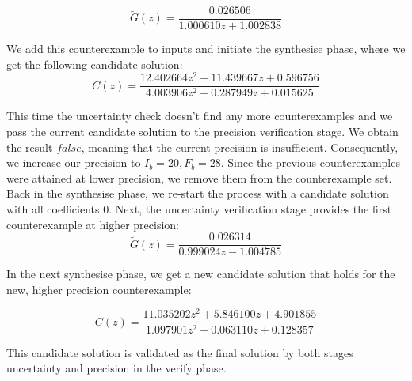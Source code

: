 \documentclass{sig-alternate-05-2015}
\newcommand{\blue}[1]{{\color{blue}#1}}
\newcommand{\red}[1]{{\color{red}#1}}
\begin{document}
$$
\tilde G(z) = \frac{0.026506}{1.000610z+1.002838}
$$



We add this counterexample to {\sc inputs} and initiate the {\sc synthesise} phase, where we get the following candidate solution: 
$$
C(z)=\frac{12.402664z^2{-}11.439667z{+}0.596756}{4.003906z^2{-}0.287949z{+}0.015625}
$$

This time the {\sc uncertainty} check doesn't find any more counterexamples 
and we pass the current candidate solution to the {\sc precision} verification stage.
We obtain the result $false$, meaning that the current precision is insufficient.
Consequently, we increase our precision to $I_b=20,F_b=28$.
%
Since the previous counterexamples were attained at lower precision, we
remove them from the counterexample set.  Back in the {\sc synthesise}
phase, we re-start the process with a candidate solution with all
coefficients $0$.  Next, the {\sc uncertainty} verification stage provides
the first counterexample at higher precision:
%
$$
\tilde G(z) = \frac{0.026314}{0.999024z{-}1.004785}
$$

In the next {\sc synthesise} phase, we get a new candidate solution that holds for
the new, higher precision counterexample:

$$
C(z)=\frac{11.035202z^2{+}5.846100z{+}4.901855}{1.097901z^2{+}0.063110z{+}0.128357}
$$
%

This candidate solution is validated as the final solution by both stages 
{\sc uncertainty} and {\sc precision} in the
{\sc verify} phase. %
\end{document}
